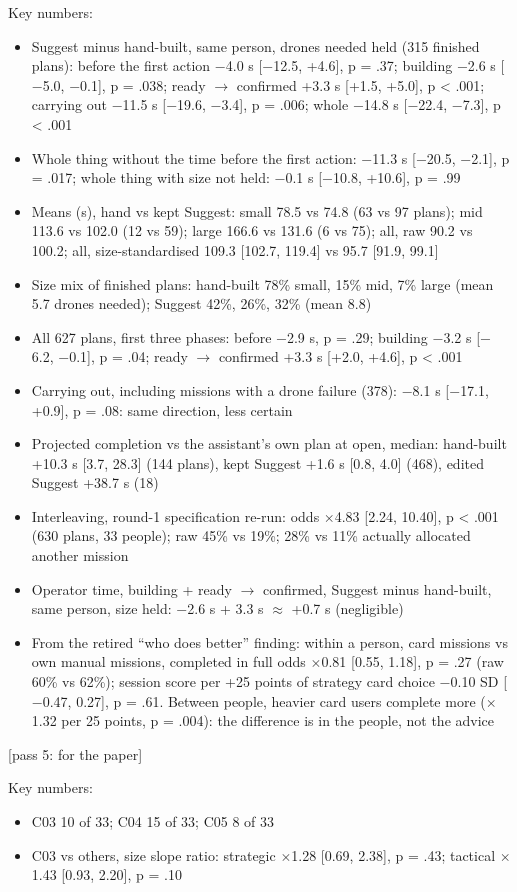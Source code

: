 \begin{options}
\noindent Key numbers:\begin{itemize}[leftmargin=1.2em,itemsep=0pt]\footnotesize
\item Suggest minus hand-built, same person, drones needed held (315 finished plans): before the first action $-$4.0 s [$-$12.5, +4.6], p = .37; building $-$2.6 s [$-$5.0, $-$0.1], p = .038; ready $\rightarrow$ confirmed +3.3 s [+1.5, +5.0], p < .001; carrying out $-$11.5 s [$-$19.6, $-$3.4], p = .006; whole $-$14.8 s [$-$22.4, $-$7.3], p < .001
\item Whole thing without the time before the first action: $-$11.3 s [$-$20.5, $-$2.1], p = .017; whole thing with size not held: $-$0.1 s [$-$10.8, +10.6], p = .99
\item Means (s), hand vs kept Suggest: small 78.5 vs 74.8 (63 vs 97 plans); mid 113.6 vs 102.0 (12 vs 59); large 166.6 vs 131.6 (6 vs 75); all, raw 90.2 vs 100.2; all, size-standardised 109.3 [102.7, 119.4] vs 95.7 [91.9, 99.1]
\item Size mix of finished plans: hand-built 78\% small, 15\% mid, 7\% large (mean 5.7 drones needed); Suggest 42\%, 26\%, 32\% (mean 8.8)
\item All 627 plans, first three phases: before $-$2.9 s, p = .29; building $-$3.2 s [$-$6.2, $-$0.1], p = .04; ready $\rightarrow$ confirmed +3.3 s [+2.0, +4.6], p < .001
\item Carrying out, including missions with a drone failure (378): $-$8.1 s [$-$17.1, +0.9], p = .08: same direction, less certain
\item Projected completion vs the assistant's own plan at open, median: hand-built +10.3 s [3.7, 28.3] (144 plans), kept Suggest +1.6 s [0.8, 4.0] (468), edited Suggest +38.7 s (18)
\item Interleaving, round-1 specification re-run: odds $\times$4.83 [2.24, 10.40], p < .001 (630 plans, 33 people); raw 45\% vs 19\%; 28\% vs 11\% actually allocated another mission
\item Operator time, building + ready $\rightarrow$ confirmed, Suggest minus hand-built, same person, size held: $-$2.6 s + 3.3 s $\approx$ +0.7 s (negligible)
\item From the retired ``who does better'' finding: within a person, card missions vs own manual missions, completed in full odds $\times$0.81 [0.55, 1.18], p = .27 (raw 60\% vs 62\%); session score per +25 points of strategy card choice $-$0.10 SD [$-$0.47, 0.27], p = .61. Between people, heavier card users complete more ($\times$1.32 per 25 points, p = .004): the difference is in the people, not the advice
\end{itemize}

 {\footnotesize [pass 5: for the paper]}

\noindent Key numbers:\begin{itemize}[leftmargin=1.2em,itemsep=0pt]\footnotesize
\item C03 10 of 33; C04 15 of 33; C05 8 of 33
\item C03 vs others, size slope ratio: strategic $\times$1.28 [0.69, 2.38], p = .43; tactical $\times$1.43 [0.93, 2.20], p = .10
\end{itemize}
\end{options}

